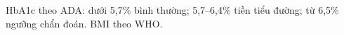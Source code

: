 HbA1c theo ADA: dưới 5,7\% bình thường; 5,7--6,4\% tiền tiểu đường; từ 6,5\% ngưỡng chẩn đoán. BMI theo WHO.
